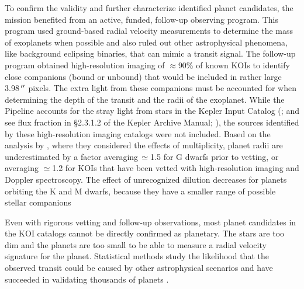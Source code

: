 To confirm the validity and further characterize identified planet candidates, the \Kepler{} mission benefited from an active, funded, follow-up observing program. This program used ground-based radial velocity measurements to determine the mass of exoplanets \citep[e.g.,][]{Marcy2014} when possible and also ruled out other astrophysical phenomena, like background eclipsing binaries, that can mimic a transit signal.  The follow-up program obtained high-resolution imaging of $\approx$90\% of known KOIs \citep[e.g.,][]{Furlan2017} to identify close companions (bound or unbound) that would be included in  rather large 3.98\,$\mbox{$^{\prime\prime}$}$ pixels.  The extra light from these companions must be accounted for when determining the depth of the transit and the radii of the exoplanet.  While the \Kepler{} Pipeline accounts for the stray light from stars in the Kepler Input Catalog (\citealt{Brown2011}; and see flux fraction in \S2.3.1.2 of the Kepler Archive Manual; \citealt{Thompson2016KAM}), the sources identified by these high-resolution imaging catalogs were not included. Based on the analysis by \citet{Ciardi2015}, where they considered the effects of multiplicity, planet radii are underestimated by a factor averaging\,$\simeq$1.5 for G dwarfs prior to vetting, or averaging $\simeq$1.2 for KOIs that have been vetted with high-resolution imaging and Doppler spectroscopy.  The effect of unrecognized dilution decreases for planets orbiting the K and M dwarfs, because they have a smaller range of possible stellar companions


Even with rigorous vetting and follow-up observations, most planet candidates in the KOI catalogs cannot be directly confirmed as planetary. The stars are too dim and the planets are too small to be able to measure a radial velocity signature for the planet.   Statistical methods study the likelihood that the observed transit could be caused by other astrophysical scenarios and have succeeded in validating thousands of \Kepler{} planets \citep[e.g.][]{Morton2016,Torres2015,Rowe2014,Lissauer2014}.  

